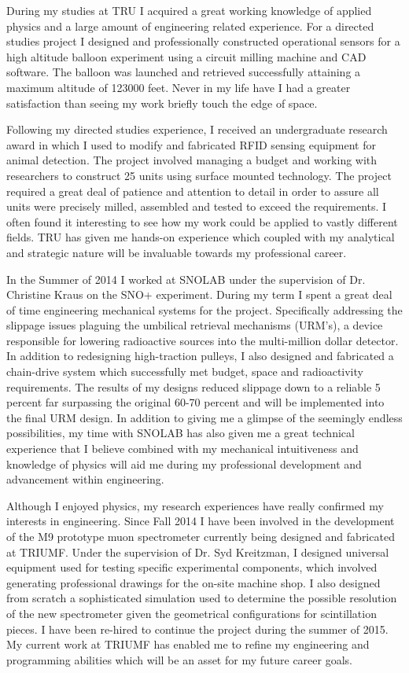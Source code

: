 \documentclass[11pt,a4paper,sans]{moderncv} %
\begin{document}
  During my studies at TRU I acquired a great working knowledge of applied physics and a large amount of engineering related experience. For a directed studies project I designed and professionally constructed operational sensors for a high altitude balloon experiment using a circuit milling machine and CAD software. The balloon was launched and retrieved successfully attaining a maximum altitude of 123000 feet. Never in my life have I had a greater satisfaction than seeing my work briefly touch the edge of space. 

 Following my directed studies experience, I received an undergraduate research award in which I used to modify and fabricated RFID sensing equipment for animal detection. The project involved managing a budget and working with researchers to construct 25 units using surface mounted technology. The project required a great deal of patience and attention to detail in order to assure all units were precisely milled, assembled and tested to exceed the requirements. I often found it interesting to see how my work could be applied to vastly different fields. TRU has given me hands-on experience which coupled with my analytical and strategic nature will be invaluable towards my professional career.

  In the Summer of 2014 I worked at SNOLAB under the supervision of Dr. Christine Kraus on the SNO+ experiment. During my term I spent a great deal of time engineering mechanical systems for the project. Specifically addressing the slippage issues plaguing the umbilical retrieval mechanisms (URM's), a device responsible for lowering radioactive sources into the multi-million dollar detector. In addition to redesigning high-traction pulleys, I also designed and fabricated a chain-drive system which successfully met budget, space and radioactivity requirements. The results of my designs reduced slippage down to a reliable 5 percent far surpassing the original 60-70 percent and will be implemented into the final URM design. In addition to giving me a glimpse of the seemingly endless possibilities, my time with SNOLAB has also given me a great technical experience that I believe combined with my mechanical intuitiveness and knowledge of physics will aid me during my professional development and advancement within engineering.

 Although I enjoyed physics, my research experiences have really confirmed my interests in engineering. Since Fall 2014 I have been involved in the development of the M9 prototype muon spectrometer currently being designed and fabricated at TRIUMF. Under the supervision of Dr. Syd Kreitzman, I designed universal equipment used for testing specific experimental components, which involved generating professional drawings for the on-site machine shop. I also designed from scratch a sophisticated simulation used to determine the possible resolution of the new spectrometer given the geometrical configurations for scintillation pieces. I have been re-hired to continue the project during the summer of 2015. My current work at TRIUMF has enabled me to refine my engineering and programming abilities which will be an asset for my future career goals.  
 
\end{document}
